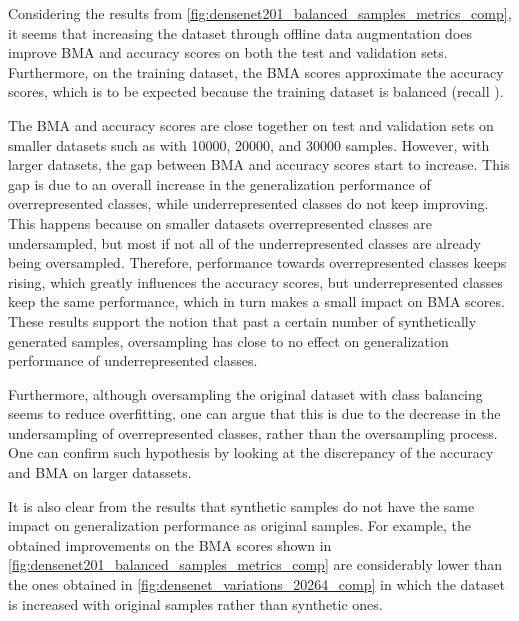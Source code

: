     Considering the results from \autoref{fig:densenet201_balanced_samples_metrics_comp}, it seems that increasing the dataset through offline data augmentation does improve \ac{BMA} and accuracy scores on both the test and validation sets. Furthermore, on the training dataset, the \ac{BMA} scores approximate the accuracy scores, which is to be expected because the training dataset is balanced (recall ). \par
    
    The \ac{BMA} and accuracy scores are close together on test and validation sets on smaller datasets such as with 10000, 20000, and 30000 samples. However, with larger datasets, the gap between \ac{BMA} and accuracy scores start to increase. This gap is due to an overall increase in the generalization performance of overrepresented classes, while underrepresented classes do not keep improving. This happens because on smaller datasets overrepresented classes are undersampled, but most if not all of the underrepresented classes are already being oversampled. Therefore, performance towards overrepresented classes keeps rising, which greatly influences the accuracy scores, but underrepresented classes keep the same performance, which in turn makes a small impact on \ac{BMA} scores. These results support the notion that past a certain number of synthetically generated samples, oversampling has close to no effect on generalization performance of underrepresented classes. \par
    
    Furthermore, although oversampling the original dataset with class balancing seems to reduce overfitting, one can argue that this is due to the decrease in the undersampling of overrepresented classes, rather than the oversampling process. One can confirm such hypothesis by looking at the discrepancy of the accuracy and \ac{BMA} on larger datassets. \par
    
    It is also clear from the results that synthetic samples do not have the same impact on generalization performance as original samples. For example, the obtained improvements on the \ac{BMA} scores shown in \autoref{fig:densenet201_balanced_samples_metrics_comp} are considerably lower than the ones obtained in \autoref{fig:densenet_variations_20264_comp} in which the dataset is increased with original samples rather than synthetic ones.  \par
    
